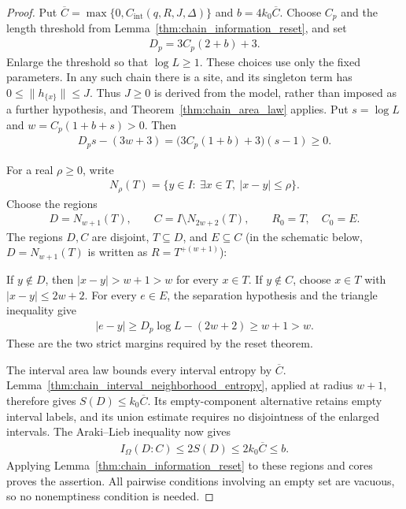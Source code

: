 \begin{proof}
    \leanok
    Put $\overline C=\max\{0,C_{\mathrm{int}}(q,R,J,\Delta)\}$ and
    $b=4k_0\overline C$. Choose $C_p$ and the length threshold from
    Lemma~\ref{thm:chain_information_reset}, and set
    \begin{align}
        D_p=3C_p(2+b)+3.
    \end{align}
    Enlarge the threshold so that $\log L\ge1$.
    These choices use only the fixed parameters.
    In any such chain there is a site, and its singleton term
    has $0\le\|h_{\{x\}}\|\le J$. Thus $J\ge0$ is derived from the
    model, rather than imposed as a further hypothesis, and
    Theorem~\ref{thm:chain_area_law} applies.
    Put $s=\log L$ and $w=C_p(1+b+s)>0$. Then
    \begin{align}
        D_p s-(3w+3)
        =\bigl(3C_p(1+b)+3\bigr)(s-1)\ge0.
    \end{align}

    For a real $\rho\ge0$, write
    \begin{align}
        N_\rho(T)=\{y\in I:\ \exists x\in T,\ |x-y|\le\rho\}.
    \end{align}
    Choose the regions
    \begin{align}
        D=N_{w+1}(T),\qquad C=I\setminus N_{2w+2}(T),
        \qquad R_0=T,\quad C_0=E.
    \end{align}
    The regions $D,C$ are disjoint, $T\subseteq D$, and $E\subseteq C$
    (in the schematic below, $D=N_{w+1}(T)$ is written as $R=T^{+(w+1)}$):
    
    If $y\notin D$, then $|x-y|>w+1>w$ for every $x\in T$.
    If $y\notin C$, choose $x\in T$ with $|x-y|\le2w+2$.
    For every $e\in E$, the separation hypothesis and the triangle
    inequality give
    \begin{align}
        |e-y|\ge D_p\log L-(2w+2)\ge w+1>w.
    \end{align}
    These are the two strict margins required by the reset theorem.

    The interval area law bounds every interval entropy by
    $\overline C$. Lemma~\ref{thm:chain_interval_neighborhood_entropy},
    applied at radius $w+1$, therefore gives $S(D)\le k_0\overline C$.
    Its empty-component alternative retains empty interval labels,
    and its union estimate requires no disjointness of the enlarged intervals.
    The Araki--Lieb inequality now gives
    \begin{align}
        I_\Omega(D:C)\le2S(D)\le2k_0\overline C\le b.
    \end{align}
    Applying Lemma~\ref{thm:chain_information_reset} to these regions
    and cores proves the assertion. All pairwise conditions involving
    an empty set are vacuous, so no nonemptiness condition is needed.
\end{proof}

